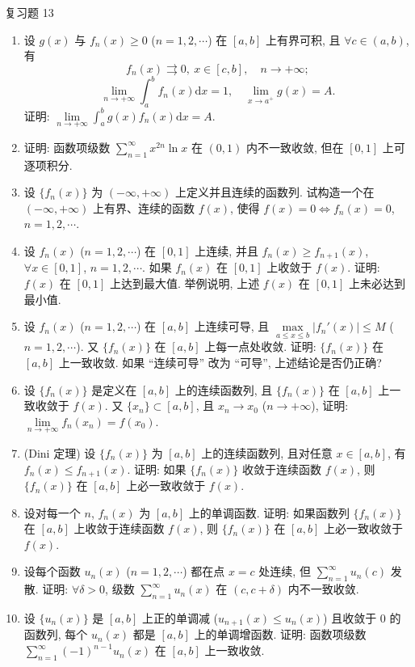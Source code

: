 \begin{exblock}{复习题 13}
\begin{enumerate}
  (2) $f(x)$ 在 $[0,1]$ 的有理点处不可导, 而在无理点处可导, 且导数
  \[
    f'(x)=\sum_{n=1}^{\infty}\frac{u_{n}'(x)}{2^{n}}.
\]
  \item 设 $g(x)$ 与 $f_{n}(x)\geqslant0$ ($n=1,2,\cdots$) 在 $[a,b]$ 上有界可积, 且 $\forall c\in(a,b)$, 有
  \[
    f_{n}(x)\rightrightarrows0,\ x\in[c,b],\quad n\to+\infty;
\]
  \[
    \lim_{n\to+\infty}\int_{a}^{b}f_{n}(x)\mathrm{d}x=1,\quad\lim_{x\to a^{+}}g(x)=A.
\]
  证明: $\lim\limits_{n\to+\infty}\int_{a}^{b}g(x)f_{n}(x)\mathrm{d}x=A$.
  \item 证明: 函数项级数 $\sum_{n=1}^{\infty}x^{2n}\ln x$ 在 $(0,1)$ 内不一致收敛, 但在 $[0,1]$ 上可逐项积分.
  \item 设 $\{f_{n}(x)\}$ 为 $(-\infty,+\infty)$ 上定义并且连续的函数列. 试构造一个在 $(-\infty,+\infty)$ 上有界、连续的函数 $f(x)$, 使得 $f(x)=0\Leftrightarrow f_{n}(x)=0$, $n=1,2,\cdots$.
  \item 设 $f_{n}(x)$ ($n=1,2,\cdots$) 在 $[0,1]$ 上连续, 并且 $f_{n}(x)\geqslant f_{n+1}(x)$, $\forall x\in[0,1]$, $n=1,2,\cdots$. 如果 $f_{n}(x)$ 在 $[0,1]$ 上收敛于 $f(x)$. 证明: $f(x)$ 在 $[0,1]$ 上达到最大值. 举例说明, 上述 $f(x)$ 在 $[0,1]$ 上未必达到最小值.
  \item 设 $f_{n}(x)$ ($n=1,2,\cdots$) 在 $[a,b]$ 上连续可导, 且 $\max\limits_{a\leqslant x\leqslant b}|f_{n}'(x)|\leqslant M$ ($n=1,2,\cdots$). 又 $\{f_{n}(x)\}$ 在 $[a,b]$ 上每一点处收敛. 证明: $\{f_{n}(x)\}$ 在 $[a,b]$ 上一致收敛. 如果 ``连续可导'' 改为 ``可导'', 上述结论是否仍正确?
  \item 设 $\{f_{n}(x)\}$ 是定义在 $[a,b]$ 上的连续函数列, 且 $\{f_{n}(x)\}$ 在 $[a,b]$ 上一致收敛于 $f(x)$. 又 $\{x_{n}\}\subset[a,b]$, 且 $x_{n}\to x_{0}$ ($n\to+\infty$), 证明: $\lim\limits_{n\to+\infty}f_{n}(x_{n})=f(x_{0})$.
  \item (Dini 定理) 设 $\{f_{n}(x)\}$ 为 $[a,b]$ 上的连续函数列, 且对任意 $x\in[a,b]$, 有 $f_{n}(x)\leqslant f_{n+1}(x)$. 证明: 如果 $\{f_{n}(x)\}$ 收敛于连续函数 $f(x)$, 则 $\{f_{n}(x)\}$ 在 $[a,b]$ 上必一致收敛于 $f(x)$.
  \item 设对每一个 $n$, $f_{n}(x)$ 为 $[a,b]$ 上的单调函数. 证明: 如果函数列 $\{f_{n}(x)\}$ 在 $[a,b]$ 上收敛于连续函数 $f(x)$, 则 $\{f_{n}(x)\}$ 在 $[a,b]$ 上必一致收敛于 $f(x)$.
  \item 设每个函数 $u_{n}(x)$ ($n=1,2,\cdots$) 都在点 $x=c$ 处连续, 但 $\sum_{n=1}^{\infty}u_{n}(c)$ 发散. 证明: $\forall\delta>0$, 级数 $\sum_{n=1}^{\infty}u_{n}(x)$ 在 $(c,c+\delta)$ 内不一致收敛.
  \item 设 $\{u_{n}(x)\}$ 是 $[a,b]$ 上正的单调减 ($u_{n+1}(x)\leqslant u_{n}(x)$) 且收敛于 $0$ 的函数列, 每个 $u_{n}(x)$ 都是 $[a,b]$ 上的单调增函数. 证明: 函数项级数 $\sum_{n=1}^{\infty}(-1)^{n-1}u_{n}(x)$ 在 $[a,b]$ 上一致收敛.

\end{enumerate}
\end{exblock}
